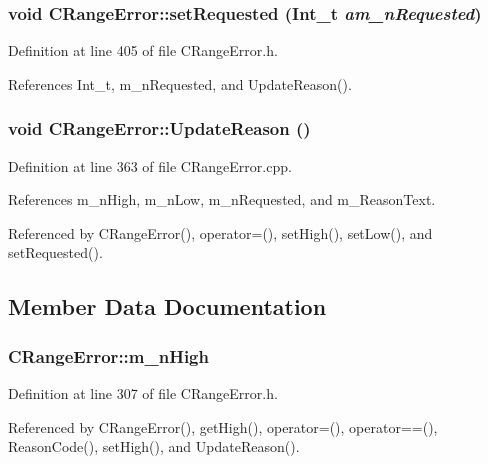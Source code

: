 \subsubsection{\setlength{\rightskip}{0pt plus 5cm}void CRange\-Error::set\-Requested ({\bf Int\_\-t} {\em am\_\-n\-Requested})\hspace{0.3cm}{\tt  [inline, protected]}}\label{classCRangeError_b2}




Definition at line 405 of file CRange\-Error.h.

References Int\_\-t, m\_\-n\-Requested, and Update\-Reason().
\subsubsection{\setlength{\rightskip}{0pt plus 5cm}void CRange\-Error::Update\-Reason ()\hspace{0.3cm}{\tt  [protected]}}\label{classCRangeError_b3}




Definition at line 363 of file CRange\-Error.cpp.

References m\_\-n\-High, m\_\-n\-Low, m\_\-n\-Requested, and m\_\-Reason\-Text.

Referenced by CRange\-Error(), operator=(), set\-High(), set\-Low(), and set\-Requested().

\subsection{Member Data Documentation}
\subsubsection{ CRange\-Error::m\_\-n\-High\hspace{0.3cm}{\tt  [private]}}\label{classCRangeError_o1}




Definition at line 307 of file CRange\-Error.h.

Referenced by CRange\-Error(), get\-High(), operator=(), operator==(), Reason\-Code(), set\-High(), and Update\-Reason().
